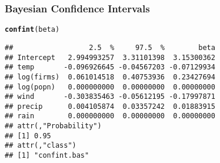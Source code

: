 \documentclass{beamer}\usepackage[]{graphicx}\usepackage[]{color}
\makeatletter
\newcommand{\hlstd}[1]{\textcolor[rgb]{0.345,0.345,0.345}{#1}}%
\newcommand{\hlkwd}[1]{\textcolor[rgb]{0.737,0.353,0.396}{\textbf{#1}}}%
\newenvironment{kframe}{%
 \def\at@end@of@kframe{}%
 \ifinner\ifhmode%
  \def\at@end@of@kframe{\end{minipage}}%
  \begin{minipage}{\columnwidth}%
 \fi\fi%
 \def\FrameCommand##1{\hskip\@totalleftmargin \hskip-\fboxsep
 \colorbox{shadecolor}{##1}\hskip-\fboxsep
     \hskip-\linewidth \hskip-\@totalleftmargin \hskip\columnwidth}%
 \MakeFramed {\advance\hsize-\width
   \@totalleftmargin\z@ \linewidth\hsize
   \@setminipage}}%
 {\par\unskip\endMakeFramed%
 \at@end@of@kframe}
\newenvironment{knitrout}{}{} %
\makeatother
\begin{document}
\begin{frame}[fragile] \frametitle{Bayesian Confidence Intervals}
\begin{knitrout}
\color{fgcolor}\begin{kframe}
\begin{alltt}
\hlkwd{confint}\hlstd{(beta)}
\end{alltt}
\begin{verbatim}
##                  2.5  %     97.5  %        beta
## Intercept   2.994993257  3.31101398  3.15300362
## temp       -0.096926645 -0.04567203 -0.07129934
## log(firms)  0.061014518  0.40753936  0.23427694
## log(popn)   0.000000000  0.00000000  0.00000000
## wind       -0.303835463 -0.05612195 -0.17997871
## precip      0.004105874  0.03357242  0.01883915
## rain        0.000000000  0.00000000  0.00000000
## attr(,"Probability")
## [1] 0.95
## attr(,"class")
## [1] "confint.bas"
\end{verbatim}
\end{kframe}
\end{knitrout}
\end{frame}
\end{document}
